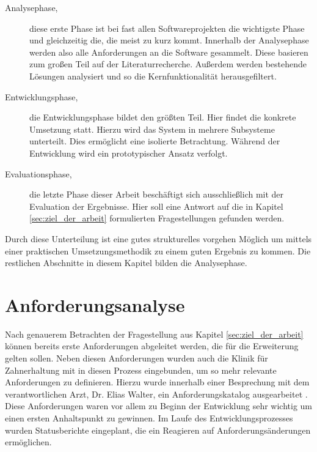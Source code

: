 \begin{description}
	\item[Analysephase,] diese erste Phase ist bei fast allen Softwareprojekten die
		wichtigste Phase und gleichzeitig die, die meist zu kurz kommt. Innerhalb der
		Analysephase werden also alle Anforderungen an die Software gesammelt. Diese
		basieren zum großen Teil auf der Literaturrecherche. Außerdem werden bestehende
		Lösungen analysiert und so die Kernfunktionalität herausgefiltert.

	\item[Entwicklungsphase,] die Entwicklungsphase bildet den größten Teil. Hier
		findet die konkrete Umsetzung statt. Hierzu wird das System in mehrere Subsysteme
		unterteilt. Dies ermöglicht eine isolierte Betrachtung. Während der Entwicklung
		wird ein prototypischer Ansatz verfolgt.

	\item[Evaluationsphase,] die letzte Phase dieser Arbeit beschäftigt sich ausschließlich
		mit der Evaluation der Ergebnisse. Hier soll eine Antwort auf die in Kapitel
		\ref{sec:ziel_der_arbeit} formulierten Fragestellungen gefunden werden.
\end{description}

Durch diese Unterteilung ist eine gutes strukturelles vorgehen Möglich um mittels
einer praktischen Umsetzungsmethodik zu einem guten Ergebnis zu kommen. Die
restlichen Abschnitte in diesem Kapitel bilden die Analysephase.

\section{Anforderungsanalyse}
\label{sec:anforderungsanalyse} Nach genauerem Betrachten der Fragestellung aus
Kapitel \ref{sec:ziel_der_arbeit} können bereits erste Anforderungen abgeleitet
werden, die für die Erweiterung gelten sollen. Neben diesen Anforderungen wurden
auch die Klinik für Zahnerhaltung mit in diesen Prozess eingebunden, um so mehr relevante
Anforderungen zu definieren. Hierzu wurde innerhalb einer Besprechung mit dem
verantwortlichen Arzt, Dr. Elias Walter, ein Anforderungskatalog ausgearbeitet \citep[vgl.][]{walter2025}.
Diese Anforderungen waren vor allem zu Beginn der Entwicklung sehr wichtig um einen
ersten Anhaltspunkt zu gewinnen. Im Laufe des Entwicklungsprozesses wurden
Statusberichte eingeplant, die ein Reagieren auf Anforderungsänderungen ermöglichen.

